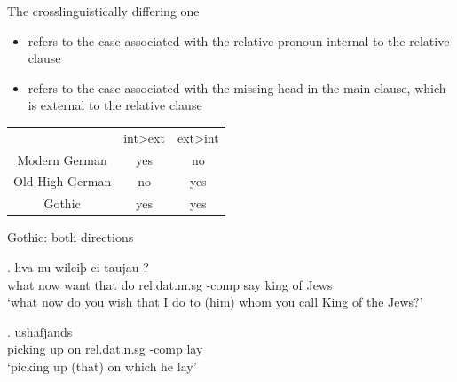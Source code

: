 \documentclass[12pt]{beamer}
\newcommand*{\mybox}[1]{\framebox{#1}} %
\begin{document}
\begin{frame}{The crosslinguistically differing one}

\begin{itemize}
  \item {} refers to the case associated with the relative pronoun internal to the relative clause
  \item {} refers to the case associated with the missing head in the main clause, which is external to the relative clause
\end{itemize}

\pause

\begin{table}[h]
	\center
		\begin{tabular}{ccc}
		\toprule
		 					      & \ac{int}>\ac{ext}		& \ac{ext}>\ac{int}	\\
								      \cmidrule{2-3}
		Modern German 	& yes			 						&	no								\\
		Old High German	& no									&	yes								\\
		Gothic		      &	yes									&	yes								\\
		\bottomrule
		\end{tabular}
\end{table}

\end{frame}


\begin{frame}{Gothic: both directions}

\exg. hva nu wileiþ ei taujau \mybox{þamm}    ?\\
 what now want that do\scsub{[dat]} \ac{rel}.\ac{dat}.\ac{m}.\ac{sg} -\ac{comp} say\scsub{[acc]} king {of Jews}\\
 `what now do you wish that I do to (him) whom you call King of the Jews?' \label{ex:gothic-dat-acc-rep}

\exg. ushafjands  \mybox{\tbf{þamm}}  \\
{picking up}\scsub{[acc]} on\scsub{[dat]} \ac{rel}.\ac{dat}.\ac{n}.\ac{sg} -\ac{comp} lay\\
`picking up (that) on which he lay' \label{ex:gothic-acc-dat-rep}

\end{frame}
\end{document}

